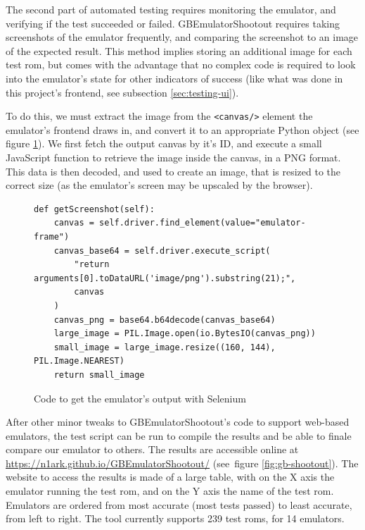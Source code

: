 \documentclass[11pt]{report}
\begin{document}
The second part of automated testing requires monitoring the emulator, and verifying if the test succeeded or failed. GBEmulatorShootout requires taking screenshots of the emulator frequently, and comparing the screenshot to an image of the expected result. This method implies storing an additional image for each test \gls{rom}, but comes with the advantage that no complex code is required to look into the emulator's state for other indicators of success (like what was done in this project's frontend, see subsection \ref{sec:testing-ui}).

To do this, we must extract the image from the \texttt{<canvas/>} element the emulator's frontend draws in, and convert it to an appropriate Python object (see figure \ref{fig:selenium-screenshot}). We first fetch the output canvas by it's ID, and execute a small JavaScript function to retrieve the image inside the canvas, in a PNG format. This data is then decoded, and used to create an image, that is resized to the correct size (as the emulator's screen may be upscaled by the browser).

\begin{figure}[h]
    \begin{verbatim}
def getScreenshot(self):
    canvas = self.driver.find_element(value="emulator-frame")
    canvas_base64 = self.driver.execute_script(
    	"return arguments[0].toDataURL('image/png').substring(21);", 
    	canvas
    )
    canvas_png = base64.b64decode(canvas_base64)
    large_image = PIL.Image.open(io.BytesIO(canvas_png))
    small_image = large_image.resize((160, 144), PIL.Image.NEAREST)
    return small_image
    \end{verbatim}
    \caption{Code to get the emulator's output with Selenium}
    \label{fig:selenium-screenshot}
\end{figure}

After other minor tweaks to GBEmulatorShootout's code to support web-based emulators, the test script can be run to compile the results and be able to finale compare our emulator to others. The results are accessible online at \url{https://n1ark.github.io/GBEmulatorShootout/} (see~figure \ref{fig:gb-shootout}). The website to access the results is made of a large table, with on the X axis the emulator running the test \gls{rom}, and on the Y axis the name of the test \gls{rom}. Emulators are ordered from most accurate (most tests passed) to least accurate, from left to right. The tool currently supports 239 test \glspl{rom}, for 14 emulators.
\end{document}
